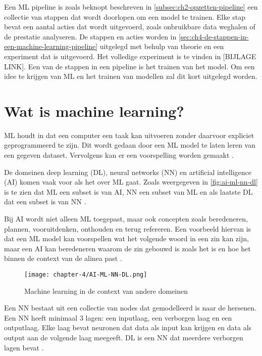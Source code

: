  
Een ML pipeline is zoals beknopt beschreven in \autoref{subsec:ch2-opzetten-pipeline} een collectie van stappen dat wordt doorlopen om een model te trainen. Elke stap bevat een aantal acties dat wordt uitgevoerd, zoals onbruikbare data weghalen of de prestatie analyseren. De stappen en acties worden in \autoref{sec:ch4-de-stappen-in-een-machine-learning-pipeline} uitgelegd met behulp van theorie en een experiment dat is uitgevoerd. Het volledige experiment is te vinden in [BIJLAGE LINK]. Een van de stappen in een pipeline is het trainen van het model. Om een idee te krijgen van ML en het trainen van modellen zal dit kort uitgelegd worden.

\section{Wat is machine learning?}\label{sec:ch4-wat-is-machine-learning}
ML houdt in dat een computer een taak kan uitvoeren zonder daarvoor expliciet geprogrammeerd te zijn. Dit wordt gedaan door een ML model te laten leren van een gegeven dataset. Vervolgens kan er een voorspelling worden gemaakt \cite[p.~1-3]{introduction-to-machine-learning}.

De domeinen deep learning (DL), neural networks (NN) en artificial intelligence (AI) komen vaak voor als het over ML gaat. Zoals weergegeven in \autoref{fig:ai-ml-nn-dl} is te zien dat ML een subset is van AI, NN een subset van ML en als laatste DL dat een subset is van NN \cite{ai-ml-nn-dl}. 

Bij AI wordt niet alleen ML toegepast, maar ook concepten zoals beredeneren, plannen, vooruitdenken, onthouden en terug refereren. Een voorbeeld hiervan is dat een ML model kan voorspellen wat het volgende woord in een zin kan zijn, maar een AI kan beredeneren waarom de zin gebouwd is zoals het is en hoe het binnen de context van de alinea past \cite{ml-think-about-ml-brownlee}.

\begin{figure}[hbt!]
  \centering
  \texttt{[image: chapter-4/AI-ML-NN-DL.png]}
  \caption{Machine learning in de context van andere domeinen}
  \label{fig:ai-ml-nn-dl}
\end{figure}

Een NN bestaat uit een collectie van nodes dat gemodelleerd is naar de hersenen. Een NN heeft minimaal 3 lagen: een inputlaag, een verborgen laag en een outputlaag. Elke laag bevat neuronen dat data als input kan krijgen en data als output aan de volgende laag meegeeft. DL is een NN dat meerdere verborgen lagen bevat \cite{ml-neural-network-nicholson}.

